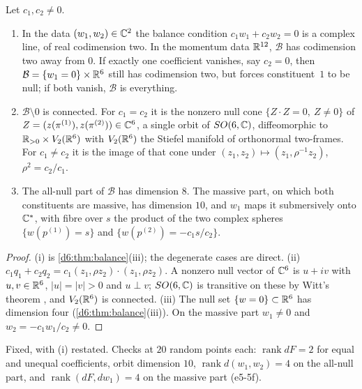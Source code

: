 \begin{proposition}
\label{e5:prop:Bgeom}
Let $c_1,c_2\neq0$.
\begin{enumerate}[label=(\roman*),leftmargin=2.2em]
\item In the data $(w_1,w_2)\in\mathbb{C}^2$ the balance condition $c_1w_1+c_2w_2=0$ is a complex line, of real codimension two. In the momentum data
$\mathbb{R}^{12}$, $\mathcal B$ has codimension two away from $0$. If exactly one coefficient vanishes, say $c_2=0$, then $\mathcal B=\{w_1=0\}\times\mathbb{R}^6$
still has codimension two, but forces constituent~$1$ to be null; if both vanish, $\mathcal B$ is everything.
\item $\mathcal B\setminus0$ is connected. For $c_1=c_2$ it is the nonzero null cone $\{Z\cdot Z=0,\ Z\neq0\}$ of $Z=(z(\pi^{(1)}),z(\pi^{(2)}))\in\mathbb{C}^6$,
a single orbit of $SO(6,\mathbb{C})$, diffeomorphic to $\mathbb{R}_{>0}\times V_2(\mathbb{R}^6)$ with $V_2(\mathbb{R}^6)$ the Stiefel manifold of orthonormal two-frames. For $c_1\neq c_2$
it is the image of that cone under $(z_1,z_2)\mapsto(z_1,\rho^{-1}z_2)$, $\rho^2=c_2/c_1$.
\item The all-null part of $\mathcal B$ has dimension $8$. The massive part, on which both constituents are massive, has dimension $10$, and $w_1$ maps it
submersively onto $\mathbb{C}^*$, with fibre over $s$ the product of the two complex spheres $\{w(p^{(1)})=s\}$ and $\{w(p^{(2)})=-c_1s/c_2\}$.
\end{enumerate}
\end{proposition}

\begin{proof}
(i) is \cref{d6:thm:balance}(iii); the degenerate cases are direct. (ii) $c_1q_1+c_2q_2=c_1(z_1,\rho z_2)\cdot(z_1,\rho z_2)$. A nonzero null vector of
$\mathbb{C}^6$ is $u+iv$ with $u,v\in\mathbb{R}^6$, $|u|=|v|>0$ and $u\perp v$; $SO(6,\mathbb{C})$ is transitive on these by Witt's theorem \cite{Witt37}, and $V_2(\mathbb{R}^6)$ is
connected. (iii) The null set $\{w=0\}\subset\mathbb{R}^6$ has dimension four (\cref{d6:thm:balance}(iii)). On the massive part $w_1\neq0$ and $w_2=-c_1w_1/c_2\neq0$.
\end{proof}

Fixed, with (i) restated. Checks at $20$ random points each: $\operatorname{rank}dF=2$ for equal and unequal coefficients, orbit dimension $10$,
$\operatorname{rank}d(w_1,w_2)=4$ on the all-null part, and $\operatorname{rank}(dF,dw_1)=4$ on the massive part (e5-5f).

